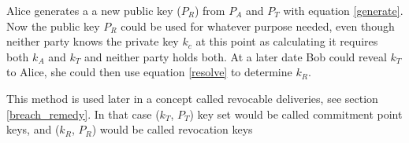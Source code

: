 Alice generates a a new public key ($P_R$) from $P_A$ and $P_T$ with equation \ref{generate}. Now the public key $P_R$ could be used for whatever purpose needed, even though neither party knows the private key $k_c$ at this point as calculating it requires both $k_A$ and $k_T$ and neither party holds both. At a later date Bob could reveal $k_T$ to Alice, she could then use equation \ref{resolve} to determine $k_R$. 

This method is used later in a concept called revocable deliveries, see section \ref{breach_remedy}. In that case ($k_T$, $P_T$) key set would be called commitment point keys, and ($k_R$, $P_R$) would be called revocation keys